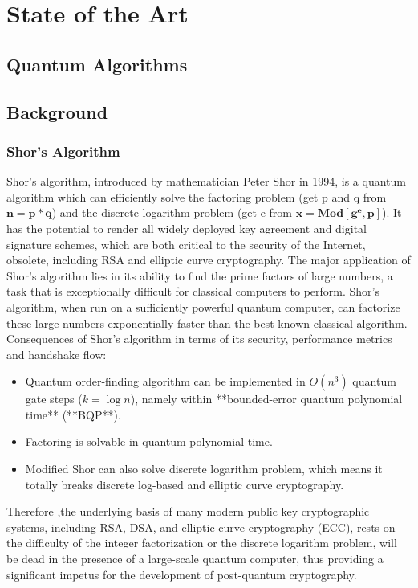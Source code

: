 \chapter{State of the Art}

\section{Quantum Algorithms}

\section{Background}
\subsection{Shor's Algorithm}

Shor's algorithm, introduced by mathematician Peter Shor in 1994, is a quantum algorithm which can efficiently solve the factoring problem (get p and q from \noindent\(\pmb{n=p*q}\)) and the discrete logarithm problem (get e from \noindent\(\pmb{x=\text{Mod}\left[g^e,p\right]}\)). It has the potential to render all widely deployed key agreement and digital signature schemes, which are both critical to the security of the Internet, obsolete, including RSA and elliptic curve cryptography. The major application of Shor's algorithm lies in its ability to find the prime factors of large numbers, a task that is exceptionally difficult for classical computers to perform. Shor's algorithm, when run on a sufficiently powerful quantum computer, can factorize these large numbers exponentially faster than the best known classical algorithm.
Consequences of Shor’s algorithm in terms of its security, performance metrics and handshake flow:
\begin{itemize}
\item Quantum order-finding algorithm can be implemented in $O(n^3)$ quantum gate steps ($k= \log{}n$), namely within **bounded-error quantum polynomial time** (**BQP**).
\item Factoring is solvable in quantum polynomial time.
\item Modified Shor can also solve discrete logarithm problem, which means it totally breaks discrete log-based and elliptic curve cryptography.
\end{itemize}
Therefore ,the underlying basis of many modern public key cryptographic systems, including RSA, DSA, and elliptic-curve cryptography (ECC), rests on the difficulty of the integer factorization or the discrete logarithm problem, will be dead in the presence of a large-scale quantum computer, thus providing a significant impetus for the development of post-quantum cryptography.
